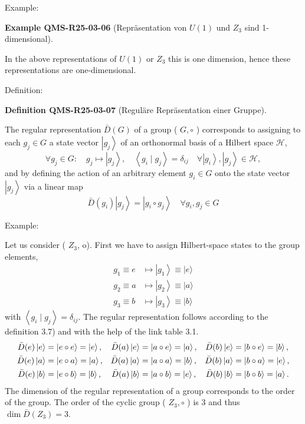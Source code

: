 \documentclass[10pt, letterpaper]{article}
\newcommand{\CustomHeading}[3]{%
  \par\medskip\noindent%
  \textbf{#1 #2} \textnormal{(#3)}.\enskip%
}
\newenvironment{DEF}[2]{\begin{unitbox}\CustomHeading{Definition}{#1}{#2}}{\end{unitbox}}
\newenvironment{EXA}[2]{\begin{unitbox}\CustomHeading{Example}{#1}{#2}}{\end{unitbox}}
\begin{document}
Example: 

\begin{EXA}{QMS-R25-03-06}{Repräsentation von $U(1)$ und $Z_3$ sind 1-dimensional}
In the above representations of $U(1)$ or $Z_{3}$ this is one dimension, hence these representations are one-dimensional.
\end{EXA}


Definition: 

\begin{DEF}{QMS-R25-03-07}{Reguläre Repräsentation einer Gruppe}
The regular representation $\bar{D}(G)$ of a group ( $G, \circ$ ) corresponds to assigning to each $g_{j} \in G$ a state vector $\left|g_{j}\right\rangle$ of an orthonormal basis of a Hilbert space $\mathcal{H}$,
$$
\forall g_{j} \in G: \quad g_{j} \mapsto\left|g_{j}\right\rangle, \quad\left\langle g_{i} \mid g_{j}\right\rangle=\delta_{i j} \quad \forall\left|g_{i}\right\rangle,\left|g_{j}\right\rangle \in \mathcal{H},
$$
and by defining the action of an arbitrary element $g_{i} \in G$ onto the state vector $\left|g_{j}\right\rangle$ via a linear map
$$
\bar{D}\left(g_{i}\right)\left|g_{j}\right\rangle=\left|g_{i} \circ g_{j}\right\rangle \quad \forall g_{i}, g_{j} \in G
$$
\end{DEF}


Example: 

Let us consider ( $Z_{3}$, o). First we have to assign Hilbert-space states to the group elements,
$$
\begin{aligned} g_1 \equiv e & \mapsto\left|g_1\right\rangle \equiv|e\rangle \\ g_2 \equiv a & \mapsto\left|g_2\right\rangle \equiv|a\rangle \\ g_3 \equiv b & \mapsto\left|g_3\right\rangle \equiv|b\rangle\end{aligned}
$$
with $\left\langle g_{i} \mid g_{j}\right\rangle=\delta_{i j}$. The regular representation follows according to the definition 3.7) and with the help of the link table 3.1.
\[
\begin{aligned}
\bar{D}(e)\ket{e} &= \ket{e \circ e} = \ket{e}, & \bar{D}(a)\ket{e} &= \ket{a \circ e} = \ket{a}, & \bar{D}(b)\ket{e} &= \ket{b \circ e} = \ket{b}, \\ 
\bar{D}(e)\ket{a} &= \ket{e \circ a} = \ket{a}, & \bar{D}(a)\ket{a} &= \ket{a \circ a} = \ket{b}, & \bar{D}(b)\ket{a} &= \ket{b \circ a} = \ket{e}, \\
\bar{D}(e)\ket{b} &= \ket{e \circ b} = \ket{b}, & \bar{D}(a)\ket{b} &= \ket{a \circ b} = \ket{e}, & \bar{D}(b)\ket{b} &= \ket{b \circ b} = \ket{a}. 
\end{aligned}
\]
The dimension of the regular representation of a group corresponds to the order of the group. The order of the cyclic group ( $Z_{3}, \circ$ ) is 3 and thus $\operatorname{dim} \bar{D}\left(Z_{3}\right)=3$.
\end{document}

